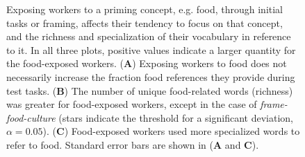 \documentclass{sigchi}
\begin{document}
\begin{figure}
	\caption{
		Exposing workers to a priming concept, e.g. food, through
		initial tasks or framing, affects their tendency to focus
		on that concept, and the richness and specialization of their 
		vocabulary in reference to it.
		In all three plots, positive values indicate a larger quantity for 
		the food-exposed workers.
		(\textbf{A}) Exposing workers to food does not necessarily increase
		the fraction food references they provide during test tasks.
		(\textbf{B}) The number of unique food-related
		words (richness) was greater for food-exposed workers, except in the 
		case of \textit{frame-food-culture} (stars indicate the threshold
		for a significant deviation, $\alpha=0.05$). 
		(\textbf{C}) Food-exposed
		workers used more specialized words to refer to food.
		Standard error bars are shown in (\textbf{A} and \textbf{C}).
	}
	\label{fig:specificity}
\end{figure}
\end{document}

